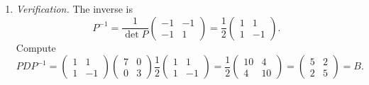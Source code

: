 \documentclass[11pt]{article}
\begin{document}
\begin{solution}
\begin{enumerate}
\item \emph{Verification.} The inverse is
\[
P^{-1}=\frac{1}{\det P}\begin{pmatrix}-1&-1\\[2pt]-1&1\end{pmatrix}
=\frac12\begin{pmatrix}1&1\\[2pt]1&-1\end{pmatrix}.
\]
Compute
\[
PDP^{-1}
=\begin{pmatrix}1&1\\[2pt]1&-1\end{pmatrix}
\begin{pmatrix}7&0\\[2pt]0&3\end{pmatrix}
\frac12\begin{pmatrix}1&1\\[2pt]1&-1\end{pmatrix}
=\frac12\begin{pmatrix}10&4\\[2pt]4&10\end{pmatrix}
=\begin{pmatrix}5&2\\[2pt]2&5\end{pmatrix}=B.
\]
\end{enumerate}
\end{solution}

\end{document}
